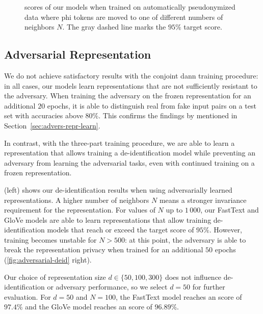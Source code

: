 \begin{figure}
    \centering
    
    \caption[De-identification with automatic pseudonymization]{%
        \fone scores of our models when trained on automatically pseudonymized data where \ac{phi} tokens are moved to one of different numbers of neighbors $N$.
        The gray dashed line marks the $95\%$ target \fone score.
}\label{fig:auto-pseudo}
\end{figure}

\subsection{Adversarial Representation}
%
We do not achieve satisfactory results with the conjoint \ac{dann} training procedure: in all cases, our models learn representations that are not sufficiently resistant to the adversary.
%
When training the adversary on the frozen representation for an additional $20$ epochs, it is able to distinguish real from fake input pairs on a test set with accuracies above $80\%$.
%
This confirms the findings by \citet{elazar2018adversarial} mentioned in Section~\ref{sec:advers-repr-learn}.

%
In contrast, with the three-part training procedure, we are able to learn a representation that allows training a de-identification model while preventing an adversary from learning the adversarial tasks, even with continued training on a frozen representation.

%
 (left) shows our de-identification results when using adversarially learned representations.
%
A higher number of neighbors $N$ means a stronger invariance requirement for the representation.
%
For values of $N$ up to $1\,000$, our FastText and GloVe models are able to learn representations that allow training de-identification models that reach or exceed the target \fone score of $95\%$.
%
However, training becomes unstable for $N>500$: at this point, the adversary is able to break the representation privacy when trained for an additional $50$ epochs (\cref{fig:adversarial-deid} right).

%
Our choice of representation size $d \in \{50, 100, 300\}$ does not influence de-identifi\-ca\-tion or adversary performance, so we select $d=50$ for further evaluation.
%
For $d=50$ and $N=100$, the FastText model reaches an \fone score of $97.4\%$ and the GloVe model reaches an \fone score of $96.89\%$.

\begin{figure*}
    \centering
    
    \caption[De-identification with adversarially learned representations]{%
        Left: de-identification \fone scores of our models using an adversarially trained representation with different numbers of neighbors $N$ for the representation invariance requirement.
        Right: mean adversary accuracy when trained on the frozen representation for an additional $50$ epochs.
        The figure shows average results out of five experiment runs.
    }\label{fig:adversarial-deid}
\end{figure*}

